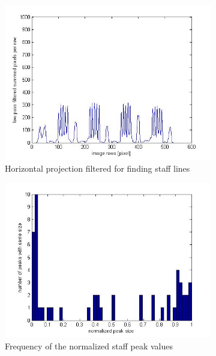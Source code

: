 \begin{figure}[htbp]
	\centering
    
  \begin{subfigure}[b]{0.48\textwidth}
        \includegraphics[width=\textwidth]{staff_textLinesHorizontalFiltered.jpg}
        \caption{Horizontal projection filtered for finding staff lines}
  \end{subfigure}
  \begin{subfigure}[b]{0.48\textwidth}
        \includegraphics[width=\textwidth]{staff_textLinesHorizontalFilteredHist.jpg}
        \caption{Frequency of the normalized staff peak values}
  \end{subfigure}
    \begin{subfigure}[b]{0.48\textwidth}

\end{subfigure}
\end{figure}
